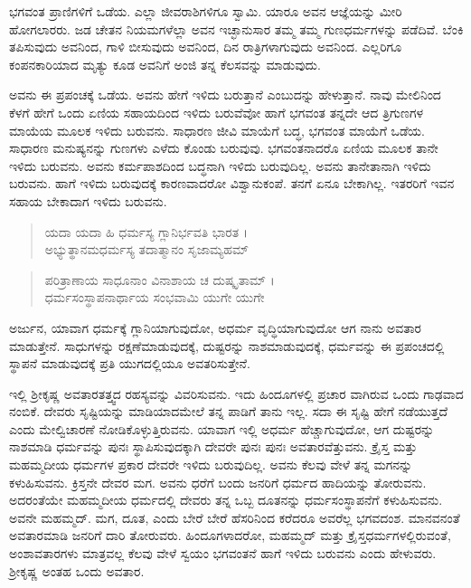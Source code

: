 ಭಗವಂತ ಪ್ರಾಣಿಗಳಿಗೆ ಒಡೆಯ. ಎಲ್ಲಾ ಜೀವರಾಶಿಗಳಿಗೂ ಸ್ವಾಮಿ. ಯಾರೂ ಅವನ ಆಜ್ಞೆಯನ್ನು ಮೀರಿ ಹೋಗಲಾರರು. ಜಡ ಚೇತನ ನಿಯಮಗಳೆಲ್ಲಾ ಅವನ ಇಚ್ಛಾನುಸಾರ ತಮ್ಮ ತಮ್ಮ ಗುಣಧರ್ಮಗಳನ್ನು ಪಡೆದಿವೆ. ಬೆಂಕಿ ತಪಿಸುವುದು ಅವನಿಂದ, ಗಾಳಿ ಬೀಸುವುದು ಅವನಿಂದ, ದಿನ ರಾತ್ರಿಗಳಾಗುವುದು ಅವನಿಂದ. ಎಲ್ಲರಿಗೂ ಕಂಪನಕಾರಿಯಾದ ಮೃತ್ಯು ಕೂಡ ಅವನಿಗೆ ಅಂಜಿ ತನ್ನ ಕೆಲಸವನ್ನು ಮಾಡುವುದು.

ಅವನು ಈ ಪ್ರಪಂಚಕ್ಕೆ ಒಡೆಯ. ಅವನು ಹೇಗೆ ಇಳಿದು ಬರುತ್ತಾನೆ ಎಂಬುದನ್ನು ಹೇಳುತ್ತಾನೆ. ನಾವು ಮೇಲಿನಿಂದ ಕೆಳಗೆ ಹೇಗೆ ಒಂದು ಏಣಿಯ ಸಹಾಯದಿಂದ ಇಳಿದು ಬರುವೆವೋ ಹಾಗೆ ಭಗವಂತ ತನ್ನದೇ ಆದ ತ್ರಿಗುಣಗಳ ಮಾಯೆಯ ಮೂಲಕ ಇಳಿದು ಬರುವನು. ಸಾಧಾರಣ ಜೀವಿ ಮಾಯೆಗೆ ಬದ್ಧ, ಭಗವಂತ ಮಾಯೆಗೆ ಒಡೆಯ. ಸಾಧಾರಣ ಮನುಷ್ಯನನ್ನು ಗುಣಗಳು ಎಳೆದು ಕೊಂಡು ಬರುವುವು. ಭಗವಂತನಾದರೊ ಏಣಿಯ ಮೂಲಕ ತಾನೇ ಇಳಿದು ಬರುವನು. ಅವನು ಕರ್ಮಪಾಶದಿಂದ ಬದ್ಧನಾಗಿ ಇಳಿದು ಬರುವುದಿಲ್ಲ. ಅವನು ತಾನೇತಾನಾಗಿ ಇಳಿದು ಬರುವನು. ಹಾಗೆ ಇಳಿದು ಬರುವುದಕ್ಕೆ ಕಾರಣವಾದರೋ ವಿಶ್ವಾನುಕಂಪೆ. ತನಗೆ ಏನೂ ಬೇಕಾಗಿಲ್ಲ. ಇತರರಿಗೆ ಇವನ ಸಹಾಯ ಬೇಕಾದಾಗ ಇಳಿದು ಬರುವನು.

\begin{verse}
ಯದಾ ಯದಾ ಹಿ ಧರ್ಮಸ್ಯ ಗ್ಲಾನಿರ್ಭವತಿ ಭಾರತ ।\\ಅಭ್ಯುತ್ಥಾನಮಧರ್ಮಸ್ಯ ತದಾತ್ಮಾನಂ ಸೃಜಾಮ್ಯಹಮ್ 
\end{verse}

\begin{verse}
ಪರಿತ್ರಾಣಾಯ ಸಾಧೂನಾಂ ವಿನಾಶಾಯ ಚ ದುಷ್ಕೃತಾಮ್ ।\\ಧರ್ಮಸಂಸ್ಥಾಪನಾರ್ಥಾಯ ಸಂಭವಾಮಿ ಯುಗೇ ಯುಗೇ 
\end{verse}

{\small ಅರ್ಜುನ, ಯಾವಾಗ ಧರ್ಮಕ್ಕೆ ಗ್ಲಾನಿಯಾಗುವುದೋ, ಅಧರ್ಮ ವೃದ್ಧಿಯಾಗುವುದೋ ಆಗ ನಾನು ಅವತಾರ ಮಾಡುತ್ತೇನೆ. ಸಾಧುಗಳನ್ನು ರಕ್ಷಣೆಮಾಡುವುದಕ್ಕೆ, ದುಷ್ಟರನ್ನು ನಾಶಮಾಡುವುದಕ್ಕೆ, ಧರ್ಮವನ್ನು ಈ ಪ್ರಪಂಚದಲ್ಲಿ ಸ್ಥಾಪನೆ ಮಾಡುವುದಕ್ಕೆ ಪ್ರತಿ ಯುಗದಲ್ಲಿಯೂ ಅವತರಿಸುತ್ತೇನೆ.}

ಇಲ್ಲಿ ಶ್ರೀಕೃಷ್ಣ ಅವತಾರತತ್ತ್ವದ ರಹಸ್ಯವನ್ನು ವಿವರಿಸುವನು. ಇದು ಹಿಂದೂಗಳಲ್ಲಿ ಪ್ರಚಾರ ವಾಗಿರುವ ಒಂದು ಗಾಢವಾದ ನಂಬಿಕೆ. ದೇವರು ಸೃಷ್ಟಿಯನ್ನು ಮಾಡಿಯಾದಮೇಲೆ ತನ್ನ ಪಾಡಿಗೆ ತಾನು ಇಲ್ಲ. ಸದಾ ಈ ಸೃಷ್ಟಿ ಹೇಗೆ ನಡೆಯುತ್ತದೆ ಎಂದು ಮೇಲ್ವಿಚಾರಣೆ ನೋಡಿಕೊಳ್ಳುತ್ತಿರುವನು. ಯಾವಾಗ ಇಲ್ಲಿ ಅಧರ್ಮ ಹೆಚ್ಚಾಗುವುದೋ, ಆಗ ದುಷ್ಟರನ್ನು ನಾಶಮಾಡಿ ಧರ್ಮವನ್ನು ಪುನಃ ಸ್ಥಾಪಿಸುವುದಕ್ಕಾಗಿ ದೇವರೇ ಪುನಃ ಪುನಃ ಅವತಾರವೆತ್ತುವನು. ಕ್ರೈಸ್ತ ಮತ್ತು ಮಹಮ್ಮದೀಯ ಧರ್ಮಗಳ ಪ್ರಕಾರ ದೇವರೇ ಇಳಿದು ಬರುವುದಿಲ್ಲ. ಅವನು ಕೆಲವು ವೇಳೆ ತನ್ನ ಮಗನನ್ನು ಕಳುಹಿಸುವನು. ಕ್ರಿಸ್ತನೇ ದೇವರ ಮಗ. ಅವನು ಧರೆಗೆ ಬಂದು ಜನರಿಗೆ ಧರ್ಮದ ಹಾದಿಯನ್ನು ತೋರುವನು. ಅದರಂತೆಯೇ ಮಹಮ್ಮದೀಯ ಧರ್ಮದಲ್ಲಿ ದೇವರು ತನ್ನ ಒಬ್ಬ ದೂತನನ್ನು ಧರ್ಮಸಂಸ್ಥಾಪನೆಗೆ ಕಳುಹಿಸುವನು. ಅವನೇ ಮಹಮ್ಮದ್. ಮಗ, ದೂತ, ಎಂದು ಬೇರೆ ಬೇರೆ ಹೆಸರಿನಿಂದ ಕರೆದರೂ ಅವರೆಲ್ಲ ಭಗವದಂಶ. ಮಾನವನಂತೆ ಅವತಾರಮಾಡಿ ಜನರಿಗೆ ದಾರಿ ತೋರುವರು. ಹಿಂದೂಗಳಾದರೋ, ಮಹಮ್ಮದ್ ಮತ್ತು ಕ್ರೈಸ್ತಧರ್ಮಗಳಲ್ಲಿರುವಂತೆ, ಅಂಶಾವತಾರಗಳು ಮಾತ್ರವಲ್ಲ ಕೆಲವು ವೇಳೆ ಸ್ವಯಂ ಭಗವಂತನೆ ಹಾಗೆ ಇಳಿದು ಬರುವನು ಎಂದು ಹೇಳುವರು. ಶ್ರೀಕೃಷ್ಣ ಅಂತಹ ಒಂದು ಅವತಾರ.

